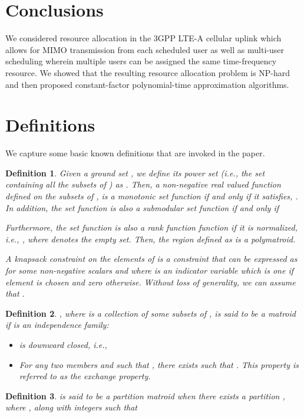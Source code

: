 \documentclass[11pt] {article}
\newtheorem{definition}{Definition}
\begin{document}
\section{Conclusions}
We considered resource allocation in the 3GPP LTE-A  cellular uplink which allows for MIMO transmission from each scheduled user as well as multi-user  scheduling wherein multiple users can be assigned the same time-frequency resource.  We showed that the resulting resource allocation problem is NP-hard and then   proposed constant-factor polynomial-time   approximation  algorithms.


\appendix

\section{Definitions}\label{app:defns}
We capture some basic known definitions that are invoked in the paper.
\begin{definition}
Given a ground set , we define its power set  (i.e., the set containing all the subsets of  ) as . Then,
a non-negative real valued function defined on the subsets of ,
 is a {\em monotonic} set function if and only if it satisfies, . In addition,
the set function is also a
{\em submodular} set function if and only if

Furthermore,  the set function is also a
 {\em rank} function function if it is normalized, i.e., , where  denotes the empty set.
 Then, the region defined as  is a {\em polymatroid}.

A {\em knapsack constraint} on the elements of  is a constraint that can be expressed as
  for some non-negative scalars  and where  is an indicator variable which is one if element  is chosen and zero otherwise. Without loss of generality, we can assume that .
 \end{definition}
\begin{definition}
  , where  is a collection of some subsets of , is said to be a {\em matroid} if  is an {\em independence family}:
  \begin{itemize}
 \item  is downward closed, i.e., 
  \item For any two members  and  such that , there exists
    such that . This property is referred to as the exchange property.
\end{itemize}
\end{definition}
\begin{definition}
  is said to be
a {\em partition matroid} when   there exists a partition , where , along with integers  such that

\end{definition}
\end{document}
